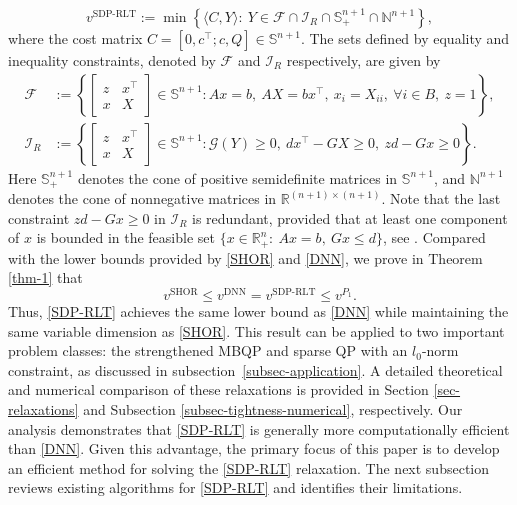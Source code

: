 \documentclass[11pt]{article}
\theoremstyle{plain}
\def\<{\big\langle}
\def\>{\big\rangle}
\def\F{\mathcal{F}}
\def\I{\mathcal{I}}
\def\R{\mathbb{R}}
\def\G{\mathcal{G}}
\def\S{\mathbb{S}}
\begin{document}
\begin{equation}
\label{SDP-RLT}
v^{\text{SDP-RLT}}:=\min\left\{
\<C,Y\>  :\  
Y\in \F\cap\I_R\cap \mathbb{S}_{+}^{n+1} \cap\mathbb{N}^{n+1}
\right\},
\tag{SDP-RLT}
\end{equation}
where the cost matrix $C=[0,c^\top; c, Q]\in\S^{n+1}$. The sets defined by equality and inequality constraints, denoted by $\F$ and $\I_R$ respectively, are given by 
\begin{align*}
\F&:= \left\{\begin{bmatrix}z& x^\top \\ x & X\end{bmatrix}\in  \mathbb{S}^{n+1} :  Ax=b,\ AX=bx^\top,\ x_i =X_{ii}, \  \forall i \in B,\ z=1\right\},\\
\I_R    &:= \left\{\begin{bmatrix}z& x^\top \\ x & X\end{bmatrix}\in  \mathbb{S}^{n+1} :  \G(Y)\geq 0,\ dx^\top-GX\geq 0,\ zd-Gx\geq 0 \right\}.
\end{align*}
% 
Here $\mathbb{S}_{+}^{n+1}$ denotes the cone of positive semidefinite matrices in $\mathbb{S}^{n+1}$, and $\mathbb{N}^{n+1}$ denotes the cone of nonnegative matrices in $\mathbb{R}^{(n+1) \times(n+1)}$. Note that the last constraint $zd-Gx\geq 0$ in $\I_R$ is redundant, provided that at least one component of $x$ is bounded in the feasible set $\{x\in\R^n_+:\ Ax=b,\ Gx\leq d\}$, see \cite[Proposition 8.1]{sherali2013reformulation}.
Compared with the lower bounds provided by \eqref{SHOR} and \eqref{DNN}, we prove in Theorem \ref{thm-1} that
\begin{equation*}
v^{\text{SHOR}} \leq 
v^{\text{DNN}} =
v^{\text{SDP-RLT}}  \leq 
v^{P_1}.
\end{equation*}
Thus, \eqref{SDP-RLT} achieves the same lower bound as \eqref{DNN} while maintaining the same variable dimension as \eqref{SHOR}. This result can be applied to two important problem classes: the strengthened MBQP and sparse QP with an $l_0$-norm constraint, as discussed in subsection~\ref{subsec-application}. 
A detailed theoretical and numerical comparison of these relaxations is provided in Section \ref{sec-relaxations} and Subsection \ref{subsec-tightness-numerical}, respectively. Our analysis demonstrates that \eqref{SDP-RLT} is generally more computationally efficient than \eqref{DNN}. Given this advantage, the primary focus of this paper is to develop an efficient method for solving the \eqref{SDP-RLT} relaxation. The next subsection reviews existing algorithms for \eqref{SDP-RLT} and identifies their limitations.
\end{document}
